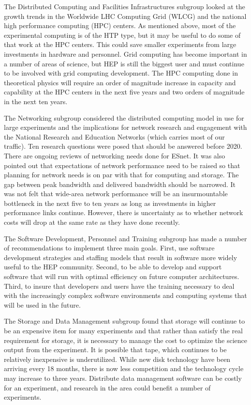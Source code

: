 The Distributed Computing and Facilities Infrastructures
subgroup looked at the growth trends in the Worldwide LHC
Computing Grid (WLCG) and the national high performance computing
(HPC) centers.  As mentioned above, most of the experimental computing
is of the HTP type, but it may be useful to do some of that work at
the HPC centers.  This could save smaller experiments from large
investments in hardware and personnel.  Grid computing has become
important in a number of areas of science, but HEP is still the
biggest user and must continue to be involved with grid computing
development.  The HPC computing done in theoretical physics will
require an order of magnitude increase in capacity and capability
at the HPC centers in the next five years and two orders of 
magnitude in the next ten years.

The Networking subgroup considered the distributed computing
model in use for large experiments and the implications for
network research and engagement with the National Research and
Education Networks (which carries most of our traffic).
Ten research questions were posed that should be answered before 2020.
There are ongoing reviews of networking needs done for ESnet.
It was also pointed out that expectations of network performance
need to be raised so that planning for network needs is on par with
that for computing and storage.  The gap between peak bandwidth and
delivered bandwidth should be narrowed.  It was not felt that wide-area
network performance will be an insurmountable bottleneck in the
next five to ten years as long as investments in higher performance
links continue.  However, there is uncertainty as to whether network
costs will drop at the same rate as they have done recently.

The Software Development, Personnel and Training subgroup has
made a number of recommendations to implement three main
goals.  First, use software development strategies and staffing models
that result in software more widely useful to the HEP
community.  Second, to be able to develop and support software
that will run with optimal efficiency on future computer architectures.
Third, to insure that developers and users have the training
necessary to deal with the increasingly complex software environments
and computing systems that will be used in the future.

The Storage and Data Management subgroup found that storage will
continue to be an expensive item for many experiments and that
rather than satisfy the real requirement for storage, it is
necessary to manage the cost to optimize the science output
from the experiment.  It is possible that tape, which continues
to be relatively inexpensive is underutilized.  While new disk
technology have been arriving every 18 months, there is now
less competition and the technology cycle may increase to three
years.  Distribute data management software can be costly for
an experiment, and research in the area could benefit a number
of experiments.

